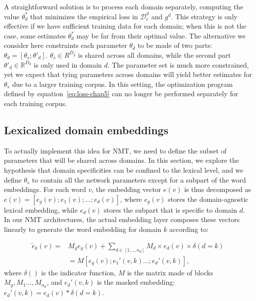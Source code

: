 A straightforward solution is to process each domain separately, computing the value $\theta_d^*$ that minimizes the empirical loss in $\mathcal{D}_e^d$ and $g^d$. This strategy is only effective if we have sufficient training data for each domain; when this is not the case, some estimates $\theta_d^*$ may be far from their optimal value. The alternative we consider here constraints each parameter $\theta_d$ to be made of two parts: $\theta_d = [\theta_s; \theta'_d]$. $\theta_s \in R^{D_g}$ is shared across all domains, while the second part $\theta'_d \in \mathbb{R}^{D_d}$ is only used in domain $d$.
The parameter set is much more constrained, yet we expect that tying parameters across domains will yield better estimates for $\theta_s$ due to a larger training corpus. In this setting, the optimization program defined by equation~\eqref{eq:loss-chap5} can no longer be performed separately for each training corpus.

\subsection{Lexicalized domain embeddings \label{ssec:lde-chap5}}
To actually implement this idea for NMT, we need to define the subset of parameters that will be shared across domains. In this section, we explore the hypothesis that domain specificities can be confined to the lexical level, and we define $\theta_s$ to contain all the network parameters except for a subpart of the word embeddings. 
For each word $v$, the embedding vector $e(v)$ is thus decomposed as $e(v) = [e_g(v); e_1(v); \dots; e_d(v)]$, where $e_g(v)$ stores the domain-agnostic lexical embedding, while $e_d(v)$ stores the subpart that is specific to domain $d$.
In our NMT architectures, the actual embedding layer composes these vectors linearly to generate the word embedding for domain $k$ according to:

\begin{align}
  \tilde{e}_k(v) =& M_g e_g(v) + \sum_{d \in [1,..,n_d]} M_d \times e_d(v) \times \delta(d=k) \nonumber \\
   & = M [e_g(v); e_1'(v,k) \dots; e_d'(v,k)], \label{eq:embedding-chap5}
\end{align}
where $\delta()$ is the indicator function, $M$ is the matrix made of blocks $M_g, M_1 \dots, M_{n_d}$, and $e_d'(v,k)$ is the masked embedding: $e_d'(v,k)= e_d(v) * \delta(d=k)$.  

